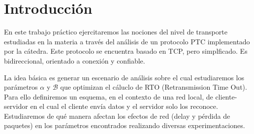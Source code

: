 \section{Introducción}
En este trabajo pr\'actico ejercitaremos las nociones del nivel de transporte estudiadas en la materia a
través del análisis de un protocolo PTC implementado por la c\'atedra. Este protocolo se encuentra basado en TCP, pero simplficado. Es bidireccional, orientado a conexi\'on y confiable. 

La idea b\'asica es generar un escenario de an\'alisis sobre el cual estudiaremos los par\'ametros $\alpha$ y $\mathcal{B}$ que optimizan el c\'aluclo de RTO (Retransmission Time Out). Para ello definiremos un esquema, en el contexto de una red local, de cliente-servidor en el cual el cliente env\'ia datos y el servidor solo los reconoce. Estudiaremos de qu\'e manera afectan los efectos de red (delay y p\'erdida de paquetes) en los par\'ametros encontrados realizando diversas experimentaciones.
